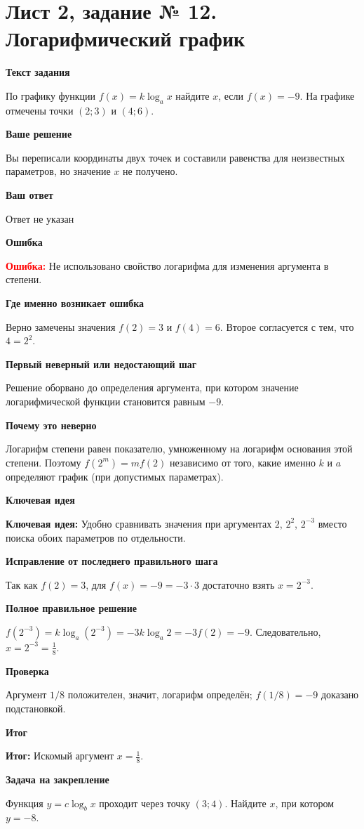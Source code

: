 \documentclass[11pt,a4paper]{article}
\newcommand{\Idea}{\textcolor{blue!60!black}{\textbf{Ключевая идея:}}}
\newcommand{\Res}{\textcolor{teal!60!black}{\textbf{Итог:}}}
\newcommand{\Heading}[2]{\par\medskip\textbf{#1}\par#2\par}
\begin{document}
\section*{Лист 2, задание № 12. Логарифмический график}
\Heading{Текст задания}{По графику функции $f(x)=k\log_a x$ найдите $x$, если $f(x)=-9$. На графике отмечены точки $(2;3)$ и $(4;6)$.}
\Heading{Ваше решение}{Вы переписали координаты двух точек и составили равенства для неизвестных параметров, но значение $x$ не получено.}
\Heading{Ваш ответ}{Ответ не указан}
\Heading{Ошибка}{\textcolor{red}{\textbf{Ошибка:}} Не использовано свойство логарифма для изменения аргумента в степени.}
\Heading{Где именно возникает ошибка}{Верно замечены значения $f(2)=3$ и $f(4)=6$. Второе согласуется с тем, что $4=2^2$.}
\Heading{Первый неверный или недостающий шаг}{Решение оборвано до определения аргумента, при котором значение логарифмической функции становится равным $-9$.}
\Heading{Почему это неверно}{Логарифм степени равен показателю, умноженному на логарифм основания этой степени. Поэтому $f(2^m)=m f(2)$ независимо от того, какие именно $k$ и $a$ определяют график (при допустимых параметрах).}
\Heading{Ключевая идея}{\Idea{} Удобно сравнивать значения при аргументах $2$, $2^2$, $2^{-3}$ вместо поиска обоих параметров по отдельности.}
\Heading{Исправление от последнего правильного шага}{Так как $f(2)=3$, для $f(x)=-9=-3\cdot3$ достаточно взять $x=2^{-3}$.}
\Heading{Полное правильное решение}{$f(2^{-3})=k\log_a(2^{-3})=-3k\log_a2=-3f(2)=-9$. Следовательно, $x=2^{-3}=\frac18$.}
\Heading{Проверка}{Аргумент $1/8$ положителен, значит, логарифм определён; $f(1/8)=-9$ доказано подстановкой.}
\Heading{Итог}{\Res{} Искомый аргумент $x=\frac18$.}
\Heading{Задача на закрепление}{Функция $y=c\log_b x$ проходит через точку $(3;4)$. Найдите $x$, при котором $y=-8$.}
\newpage
{}\label{task:2_13}
\end{document}
